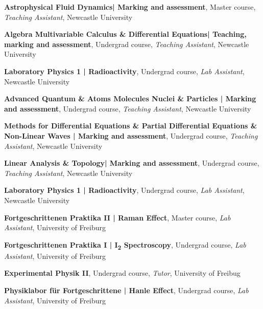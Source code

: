 

\begin{scholarship}

					{\textbf{Astrophysical Fluid Dynamics| Marking and assessment}, Master course, \textit{Teaching Assistant}, Newcastle University}%
					
					{\textbf{Algebra Multivariable Calculus \& Differential Equations| Teaching, marking and assessment}, Undergrad course, \textit{Teaching Assistant}, Newcastle University}%


					{\textbf{Laboratory Physics 1 | Radioactivity}, Undergrad course, \textit{Lab Assistant}, Newcastle University}%
					
					{\textbf{Advanced Quantum \& Atoms Molecules Nuclei \& Particles | Marking and assessment}, Undergrad course, \textit{Teaching Assistant}, Newcastle University}%
					
					{\textbf{Methods for Differential Equations \& Partial Differential Equations \& Non-Linear Waves | Marking and assessment}, Undergrad course, \textit{Teaching Assistant}, Newcastle University}%

					{\textbf{Linear Analysis \& Topology| Marking and assessment}, Undergrad course, \textit{Teaching Assistant}, Newcastle University}%
					

					{\textbf{Laboratory Physics 1 | Radioactivity}, Undergrad course, \textit{Lab Assistant}, Newcastle University}%
					
					{\textbf{Fortgeschrittenen Praktika II | Raman Effect}, Master course, \textit{Lab Assistant}, University of Freiburg}
					
	 
	 
					{\textbf{Fortgeschrittenen Praktika I | I\textsubscript{2} Spectroscopy}, Undergrad course, \textit{Lab Assistant}, University of Freiburg}
					
					
					{ \textbf{Experimental Physik II}, Undergrad course, \textit{Tutor}, University of Freibug}
					
					
					{\textbf{Physiklabor f{\"u}r Fortgeschrittene | Hanle Effect}, Undergrad course, \textit{Lab Assistant}, University of Freiburg}
					
 \emptySeparator	
\end{scholarship}